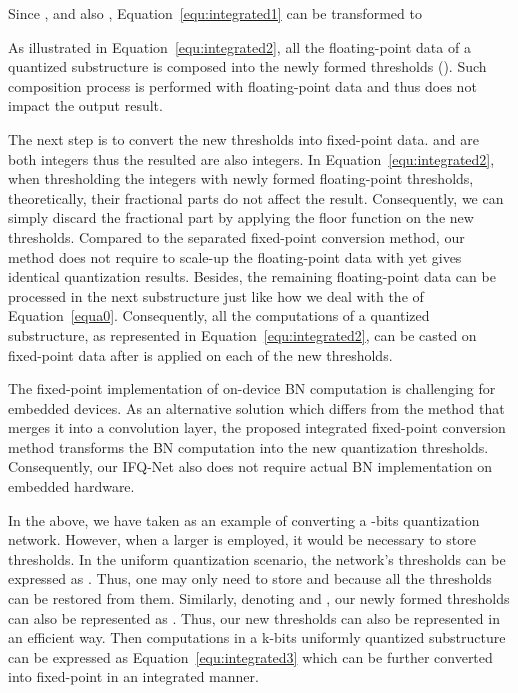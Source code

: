 \documentclass[10pt,twocolumn,letterpaper]{article}
\begin{document}
Since ,  and also , Equation~\ref{equ:integrated1} can be transformed to


As illustrated in Equation~\ref{equ:integrated2}, all the floating-point data of a quantized substructure is composed into the newly formed thresholds (\eg ). Such composition process is performed with floating-point data and thus does not impact the output result.

The next step is to convert the new thresholds into fixed-point data.  and  are both integers thus the resulted  are also integers. In Equation~\ref{equ:integrated2}, when thresholding the integers  with newly formed floating-point thresholds, theoretically, their fractional parts do not affect the result. Consequently, we can simply discard the fractional part by applying the floor function  on the new thresholds. Compared to the separated fixed-point conversion method, our method does not require to scale-up the floating-point data with  yet gives identical quantization results. Besides, the remaining floating-point data  can be processed in the next substructure just like how we deal with the  of Equation~\ref{equa0}. Consequently, all the computations of a quantized substructure, as represented in Equation~\ref{equ:integrated2}, can be casted on fixed-point data after  is applied on each of the new thresholds.

The fixed-point implementation of on-device BN computation is challenging for embedded devices. As an alternative solution which differs from the method that merges it into a convolution layer, the proposed integrated fixed-point conversion method transforms the BN computation into the new quantization thresholds. Consequently, our IFQ-Net also does not require actual BN implementation on embedded hardware.



In the above, we have taken  as an example of converting a -bits quantization network. However, when a larger  is employed, it would be necessary to store  thresholds. In the uniform quantization scenario, the network's thresholds can be expressed as . Thus, one may only need to store  and  because all the thresholds can be restored from them. Similarly, denoting  and , our newly formed thresholds can also be represented as . Thus, our new thresholds  can also be represented in an efficient way.  Then computations in a k-bits uniformly quantized substructure can be expressed as Equation~\ref{equ:integrated3} which can be further converted into fixed-point in an integrated manner.
\end{document}
